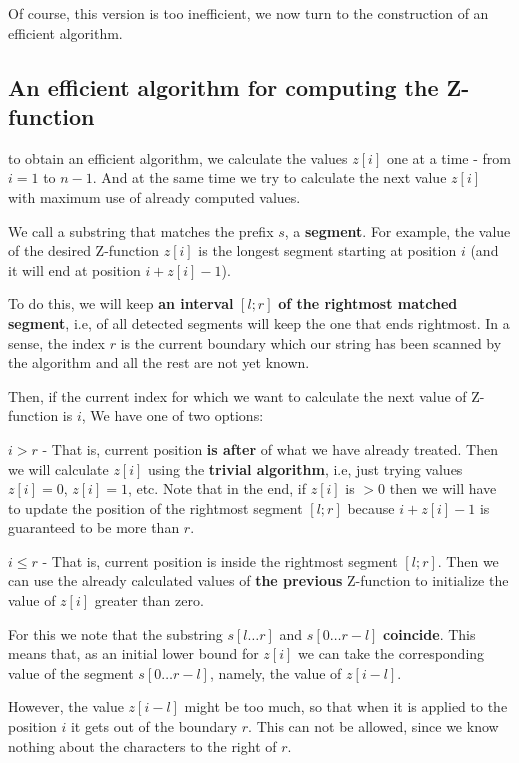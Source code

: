 Of course, this version is too inefficient, we now turn to the construction of an efficient algorithm.

\subsection{ An efficient algorithm for computing the Z-function }

to obtain an efficient algorithm, we calculate the values $z [i]$ one at a time - from $i = 1$ to $n-1$. And at the same time we try to calculate the next value $z [i]$ with maximum use of already computed values.

We call a substring that matches the prefix $s$, a \textbf{segment}. For example, the value of the desired Z-function $z [i]$ is the longest segment starting at position $i$ (and it will end at position $i + z [i] - 1$).

To do this, we will keep \textbf{an interval} \textbf{$[l; r]$} \textbf{of the rightmost matched segment}, i.e, of all detected segments will keep the one that ends rightmost. In a sense, the index $r$ is the current boundary which our string has been scanned by the algorithm and all the rest are not yet known.

Then, if the current index for which we want to calculate the next value of Z-function is $i$, We have one of two options:

$i> r$ - That is, current position \textbf{is after} of what we have already treated.
Then we will calculate $z [i]$ using the \textbf{trivial algorithm}, i.e, just trying values $z [i] = 0$, $z [i] = 1$, etc. Note that in the end, if $z [i]$ is $> 0$ then we will have to update the position of the rightmost segment $[l; r]$ because $i + z [i] - 1$ is guaranteed to be more than $r$.

$i \le r$ - That is, current position is inside the rightmost segment $[l; r]$.
Then we can use the already calculated values ​​of \textbf{the previous} Z-function to initialize the value of $z [i]$ greater than zero.

For this we note that the substring $s [l \ldots r]$ and $s [0 \ldots r-l]$ \textbf{coincide}. This means that, as an initial lower bound for $z [i]$ we can take the corresponding value of the segment $s [0 \ldots r-l]$, namely, the value of $z [i-l]$.

However, the value $z [i-l]$ might be too much, so that when it is applied to the position $i$ it gets out of the boundary $r$. This can not be allowed, since we know nothing about the characters to the right of $r$.

